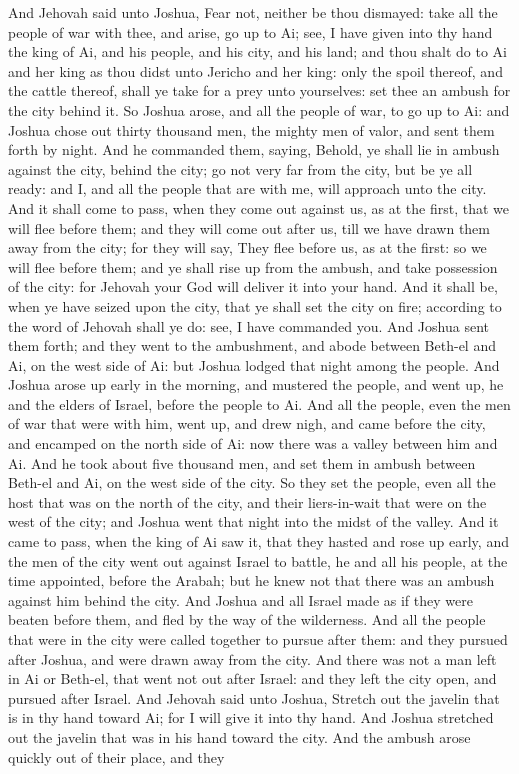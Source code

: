 And Jehovah said unto Joshua, Fear not, neither be thou dismayed: take all the people of war with thee, and arise, go up to Ai; see, I have given into thy hand the king of Ai, and his people, and his city, and his land; and thou shalt do to Ai and her king as thou didst unto Jericho and her king: only the spoil thereof, and the cattle thereof, shall ye take for a prey unto yourselves: set thee an ambush for the city behind it.  So Joshua arose, and all the people of war, to go up to Ai: and Joshua chose out thirty thousand men, the mighty men of valor, and sent them forth by night. And he commanded them, saying, Behold, ye shall lie in ambush against the city, behind the city; go not very far from the city, but be ye all ready: and I, and all the people that are with me, will approach unto the city. And it shall come to pass, when they come out against us, as at the first, that we will flee before them; and they will come out after us, till we have drawn them away from the city; for they will say, They flee before us, as at the first: so we will flee before them; and ye shall rise up from the ambush, and take possession of the city: for Jehovah your God will deliver it into your hand. And it shall be, when ye have seized upon the city, that ye shall set the city on fire; according to the word of Jehovah shall ye do: see, I have commanded you. And Joshua sent them forth; and they went to the ambushment, and abode between Beth-el and Ai, on the west side of Ai: but Joshua lodged that night among the people.  And Joshua arose up early in the morning, and mustered the people, and went up, he and the elders of Israel, before the people to Ai. And all the people, even the men of war that were with him, went up, and drew nigh, and came before the city, and encamped on the north side of Ai: now there was a valley between him and Ai. And he took about five thousand men, and set them in ambush between Beth-el and Ai, on the west side of the city. So they set the people, even all the host that was on the north of the city, and their liers-in-wait that were on the west of the city; and Joshua went that night into the midst of the valley. And it came to pass, when the king of Ai saw it, that they hasted and rose up early, and the men of the city went out against Israel to battle, he and all his people, at the time appointed, before the Arabah; but he knew not that there was an ambush against him behind the city. And Joshua and all Israel made as if they were beaten before them, and fled by the way of the wilderness. And all the people that were in the city were called together to pursue after them: and they pursued after Joshua, and were drawn away from the city. And there was not a man left in Ai or Beth-el, that went not out after Israel: and they left the city open, and pursued after Israel.  And Jehovah said unto Joshua, Stretch out the javelin that is in thy hand toward Ai; for I will give it into thy hand. And Joshua stretched out the javelin that was in his hand toward the city. And the ambush arose quickly out of their place, and they 